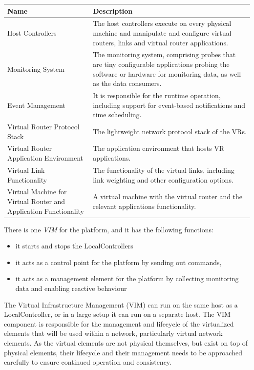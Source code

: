 \begin{longtable}{ | p{5cm} | p{9cm} | }

\hline
\textbf{Name} & \textbf{Description} \\
\hline
Host Controllers & The host controllers execute on every physical
machine and manipulate and configure virtual routers, links and virtual
router applications. \\
\hline
Monitoring System & The monitoring system, comprising probes that are tiny configurable applications
probing the software or hardware for monitoring data, as well as the
data consumers. \\
\hline
Event Management & It is responsible for the runtime operation,
including support for event-based notifications and time scheduling. \\
\hline
Virtual Router Protocol Stack & The lightweight network protocol stack
of the VRs.  \\
\hline
Virtual Router Application Environment & The application environment that hosts VR applications. \\
\hline
Virtual Link Functionality & The functionality of the virtual links,
including link weighting and other configuration options. \\
\hline
Virtual Machine for Virtual Router and Application Functionality & A
virtual machine with the virtual router and the relevant applications
functionality. \\
\hline

\end{longtable}

\noindent There is one \emph{VIM} for the platform, and it has the
following functions:

\begin{itemize}
\item it starts and stops the LocalControllers
\item it acts as a control point for the platform by sending out commands, 
\item it acts as a management element for the platform by collecting
  monitoring data and enabling reactive behaviour 
\end{itemize}

\noindent The Virtual Infrastructure Management (VIM)  can run on the same host as a
LocalController, or in a large setup it can run on a separate host.
The VIM component is responsible
for the management and lifecycle of the virtualized elements that will
be used within a network, particularly virtual network elements. As
the virtual elements are not physical themselves, but exist on top of
physical elements, their lifecycle and their management needs to be
approached carefully to ensure continued operation and consistency.


